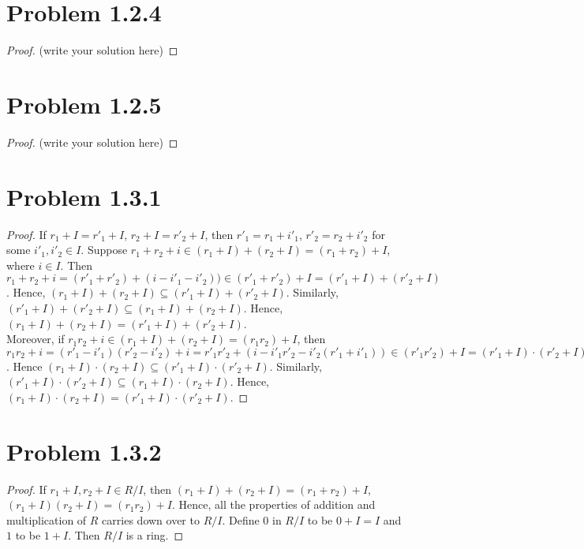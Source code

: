 \documentclass[12pt]{article}
\begin{document}
\section{Problem 1.2.4}

\begin{proof}
	(write your solution here)
\end{proof}

\newpage 

\section{Problem 1.2.5}

\begin{proof}
	(write your solution here)
\end{proof}

\newpage 

\section{Problem 1.3.1}

\begin{proof}
If $r_1 + I = r'_1 + I$, $r_2 + I = r'_2 + I$, then $r'_1 = r_1 + i'_1$, $r'_2 = r_2 + i'_2$ for some $i'_1, i'_2 \in I$. Suppose $r_1 + r_2 + i \in (r_1+I) + (r_2 + I) = (r_1+r_2) + I$, where $i \in I$. Then $r_1 + r_2 + i = (r'_1 + r'_2) + (i-i'_1-i'_2)) \in (r'_1+r'_2)+I=(r'_1 + I) + (r'_2 +I)$. Hence, $(r_1+I) + (r_2 + I) \subseteq (r'_1+I) + (r'_2 + I)$. Similarly, $(r'_1+I) + (r'_2 + I)\subseteq (r_1+I) + (r_2 + I)$. Hence, $(r_1+I) + (r_2 + I) = (r'_1+I) + (r'_2 + I)$. \\

Moreover, if $r_1r_2 + i \in (r_1+I) + (r_2 + I) = (r_1r_2) + I$, then $r_1r_2 + i = (r'_1-i'_1)(r'_2-i'_2)+i = r'_1r'_2 +(i - i'_1r'_2 - i'_2(r'_1 + i'_1)) \in (r'_1r'_2)+I=(r'_1 + I) \cdot (r'_2 +I)$. Hence $(r_1+I) \cdot (r_2 + I) \subseteq (r'_1+I) \cdot (r'_2 + I)$. Similarly, $(r'_1+I) \cdot (r'_2 + I)\subseteq (r_1+I) \cdot (r_2 + I)$. Hence, $(r_1+I) \cdot (r_2 + I) = (r'_1+I) \cdot (r'_2 + I)$. 
\end{proof}

\newpage 

\section{Problem 1.3.2}

\begin{proof}
	If $r_1+I, r_2+I \in R/I$, then $(r_1+I)+(r_2+I) = (r_1+r_2)+I$, $(r_1+I)(r_2+I) = (r_1r_2)+I$. Hence, all the properties of addition and multiplication of $R$ carries down over to $R/I$. Define $0$ in $R/I$ to be $0 + I = I$ and $1$ to be $1 + I$. Then $R/I$ is a ring.
\end{proof}
\end{document}
